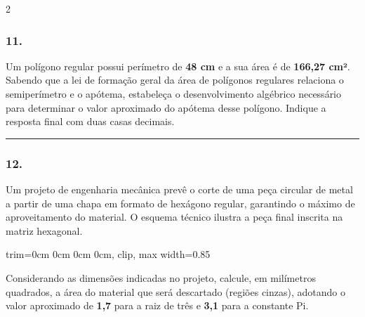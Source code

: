 \documentclass[twoside, 10pt, a4paper]{article}
\newlength{\espacoPreQuestao}\setlength{\espacoPreQuestao}{0.1cm}
\newlength{\espacoQuestao}\setlength{\espacoQuestao}{0.2cm}
\newcommand{\larguraTikz}{0.85\linewidth}
\begin{document}
\begin{multicols*}{2}
\subsubsection*{11.} Um polígono regular possui perímetro de \textbf{48 cm} e a sua área é de \textbf{166,27 cm²}. Sabendo que a lei de formação geral da área de polígonos regulares relaciona o semiperímetro e o apótema, estabeleça o desenvolvimento algébrico necessário para determinar o valor aproximado do apótema desse polígono. Indique a resposta final com duas casas decimais.
\par\vspace{\espacoQuestao}

\noindent\textcolor{CorLinha}{\rule{\linewidth}{0.5pt}} 
\par\vspace{\espacoPreQuestao}
\subsubsection*{12.} Um projeto de engenharia mecânica prevê o corte de uma peça circular de metal a partir de uma chapa em formato de hexágono regular, garantindo o máximo de aproveitamento do material. O esquema técnico ilustra a peça final inscrita na matriz hexagonal.
\begin{center}
\begin{adjustbox}{trim=0cm 0cm 0cm 0cm, clip, max width=\larguraTikz}
\end{adjustbox}
\end{center}
Considerando as dimensões indicadas no projeto, calcule, em milímetros quadrados, a área do material que será descartado (regiões cinzas), adotando o valor aproximado de \textbf{1,7} para a raiz de três e \textbf{3,1} para a constante Pi.
\par\vspace{\espacoQuestao}


\end{multicols*}
\end{document}
